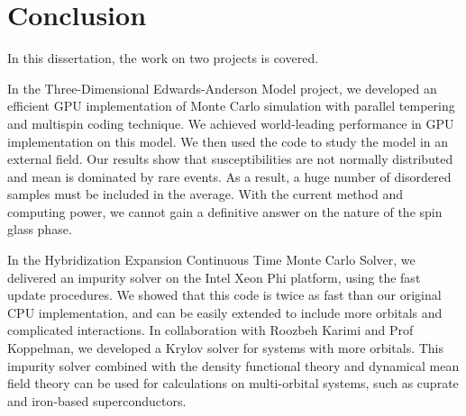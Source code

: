 \chapter{Conclusion}
In this dissertation, the work on two projects is covered.

In the Three-Dimensional Edwards-Anderson Model project, we developed an efficient
GPU implementation of Monte Carlo simulation with parallel tempering and
multispin coding technique. We achieved world-leading performance in GPU 
implementation on this model. We then used the code to study the model in an 
external field. Our results show that susceptibilities are not normally distributed and mean is 
dominated by rare events. As a result, a huge number of disordered samples must 
be included in the average. With the current method and computing power, we
cannot gain a definitive answer on the nature of the spin glass phase. 

In the Hybridization Expansion Continuous Time Monte Carlo Solver, we delivered
an impurity solver on the Intel Xeon Phi platform, using the fast update procedures.
We showed that this code is twice as fast than our original CPU implementation, 
and can be easily extended to include more orbitals and complicated interactions.
In collaboration with Roozbeh Karimi and Prof Koppelman, we developed a Krylov 
solver for systems with more orbitals. This impurity solver combined with the 
density functional theory and dynamical mean field theory can be used for
calculations on multi-orbital systems, such as cuprate and iron-based superconductors. 



